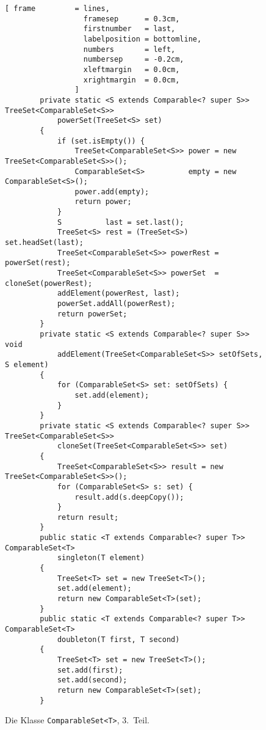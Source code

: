 \begin{figure}[!h]
\centering
\begin{Verbatim}[ frame         = lines, 
                  framesep      = 0.3cm, 
                  firstnumber   = last,
                  labelposition = bottomline,
                  numbers       = left,
                  numbersep     = -0.2cm,
                  xleftmargin   = 0.0cm,
                  xrightmargin  = 0.0cm,
                ]
        private static <S extends Comparable<? super S>> TreeSet<ComparableSet<S>> 
            powerSet(TreeSet<S> set) 
        {
            if (set.isEmpty()) {
                TreeSet<ComparableSet<S>> power = new TreeSet<ComparableSet<S>>();
                ComparableSet<S>          empty = new ComparableSet<S>();
                power.add(empty);
                return power;
            }
            S          last = set.last();
            TreeSet<S> rest = (TreeSet<S>) set.headSet(last);
            TreeSet<ComparableSet<S>> powerRest = powerSet(rest);
            TreeSet<ComparableSet<S>> powerSet  = cloneSet(powerRest);
            addElement(powerRest, last);
            powerSet.addAll(powerRest);
            return powerSet;
        }
        private static <S extends Comparable<? super S>> void 
            addElement(TreeSet<ComparableSet<S>> setOfSets, S element) 
        {
            for (ComparableSet<S> set: setOfSets) {
                set.add(element);
            }
        }
        private static <S extends Comparable<? super S>> TreeSet<ComparableSet<S>> 
            cloneSet(TreeSet<ComparableSet<S>> set) 
        {
            TreeSet<ComparableSet<S>> result = new TreeSet<ComparableSet<S>>();
            for (ComparableSet<S> s: set) {
                result.add(s.deepCopy());
            }
            return result;
        }
        public static <T extends Comparable<? super T>> ComparableSet<T> 
            singleton(T element) 
        {
            TreeSet<T> set = new TreeSet<T>();
            set.add(element);
            return new ComparableSet<T>(set);
        }
        public static <T extends Comparable<? super T>> ComparableSet<T> 
            doubleton(T first, T second) 
        {
            TreeSet<T> set = new TreeSet<T>();
            set.add(first);
            set.add(second);
            return new ComparableSet<T>(set);
        }
    \end{Verbatim}
\vspace*{-0.3cm}
\caption{Die Klasse \texttt{ComparableSet<T>}, 3.~Teil.}
\label{fig:ComparableSet-3}
\end{figure}

